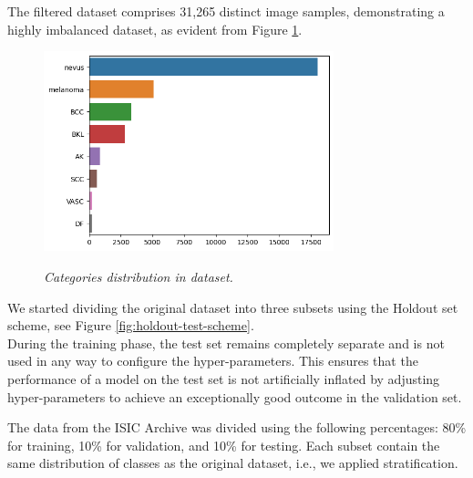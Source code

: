 The filtered dataset comprises 31,265 distinct image samples, demonstrating a
highly imbalanced dataset, as evident from Figure
\ref{fig:hole-dataset-distribution}.

\begin{figure}[H]
  \centering
  \includegraphics[width=0.75\textwidth]{imatges/data-training-strategies/hole-dataset-diagnosis.png}
  \caption[Categories distribution in dataset]{\textit{Categories distribution in dataset.}}
  {\label{fig:hole-dataset-distribution}}
\end{figure}


We started dividing the original dataset into three subsets using the Holdout
set scheme, see Figure \ref{fig:holdout-test-scheme}. \\

During the training phase, the test set remains completely separate and is not
used in any way to configure the hyper-parameters. This ensures that the
performance of a model on the test set is not artificially inflated by
adjusting hyper-parameters to achieve an exceptionally good outcome in the validation set. \\

\newpage

The data from the ISIC Archive was divided using the following percentages: 80\%
for training, 10\% for validation, and 10\% for testing. Each subset contain the same
distribution of classes as the original dataset, i.e., we applied stratification.

